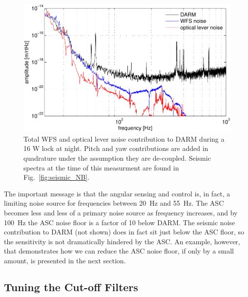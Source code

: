 \begin{figure}
\begin{centering}
\includegraphics[width=1.0\columnwidth]{figures/ASC2DARM.pdf}
\caption[Total WFS and optical lever noise contribution to DARM during
a 16 W lock at night]{Total WFS and optical lever noise contribution
  to DARM during a 16 W lock at night. Pitch and yaw contributions are
  added in quadrature under the assumption they are
  de-coupled. Seismic spectra at the time of this measurment are found
  in Fig.~\ref{fig:seismic_NB}.}
\label{fig:asc2darm}
\end{centering}
\end{figure}

The important message is that the angular sensing and control is, in
fact, a limiting noise source for frequencies between 20~Hz and
55~Hz. The ASC becomes less and less of a primary noise source as
frequency increases, and by 100~Hz the ASC noise floor is a factor of
10 below DARM. The seismic noise contribution to DARM (not shown) does
in fact sit just below the ASC floor, so the sensitivity is not
dramatically hindered by the ASC. An example, however, that
demonstrates how we can reduce the ASC noise floor, if only by a small
amount, is presented in the next section.



\subsection{Tuning the Cut-off Filters} 

